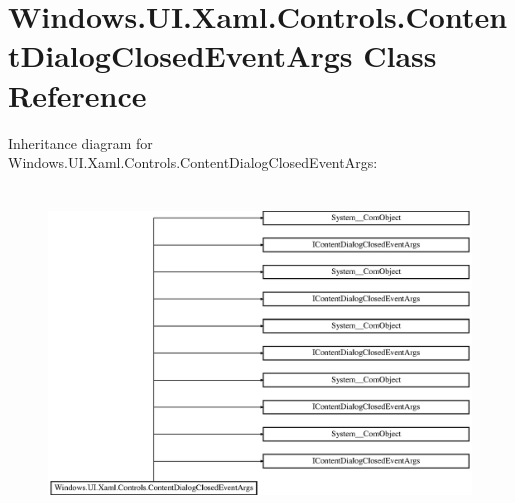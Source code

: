 \hypertarget{class_windows_1_1_u_i_1_1_xaml_1_1_controls_1_1_content_dialog_closed_event_args}{}\section{Windows.\+U\+I.\+Xaml.\+Controls.\+Content\+Dialog\+Closed\+Event\+Args Class Reference}
\label{class_windows_1_1_u_i_1_1_xaml_1_1_controls_1_1_content_dialog_closed_event_args}
Inheritance diagram for Windows.\+U\+I.\+Xaml.\+Controls.\+Content\+Dialog\+Closed\+Event\+Args\+:\begin{figure}[H]
\begin{center}
\leavevmode
\includegraphics[height=8.825214cm]{class_windows_1_1_u_i_1_1_xaml_1_1_controls_1_1_content_dialog_closed_event_args}
\end{center}
\end{figure}
